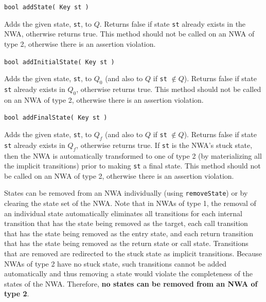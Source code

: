 \documentclass{llncs}
\begin{document}
\begin{description}

  \item\texttt{bool addState( Key st )} \nopagebreak

    Adds the given state, \texttt{st}, to $Q$.  Returns false if state \texttt{st} already exists in the NWA, otherwise returns true.  This method should not be called on an NWA of type 2, otherwise there is an assertion violation.

  \item\texttt{bool addInitialState( Key st )} \nopagebreak

    Adds the given state, \texttt{st}, to $Q_0 $ (and also to $Q$ if \texttt{st} $\not\in Q$).  Returns false if state \texttt{st} already exists in $Q_0$, otherwise returns true.  This method should not be called on an NWA of type 2, otherwise there is an assertion violation.

  \item\texttt{bool addFinalState( Key st )} \nopagebreak

    Adds the given state, \texttt{st}, to $Q_f$ (and also to $Q$ if \texttt{st} $\not\in Q$).  Returns false if state \texttt{st} already exists in $Q_f$, otherwise returns true.  If \texttt{st} is the NWA's stuck state, then the NWA is automatically transformed to one of type 2 (by materializing all the implicit transitions) prior to making \texttt{st} a final state.  This method should not be called on an NWA of type 2, otherwise there is an assertion violation. \\

\end{description}


States can be removed from an NWA individually (using \texttt{removeState}) or by clearing the state set of the NWA.  Note that in NWAs of type 1, the removal of an individual state automatically eliminates all transitions for each internal transition that has the state being removed as the target, each call transition that has the state being removed as the entry state, and each return transition that has the state being removed as the return state or call state.  Transitions that are removed are redirected to the stuck state as implicit transitions.  Because NWAs of type 2 have no stuck state, such transitions cannot be added automatically and thus removing a state would violate the completeness of the states of the NWA.  Therefore, \textbf{no states can be removed from an NWA of type 2}.  
\end{document}
